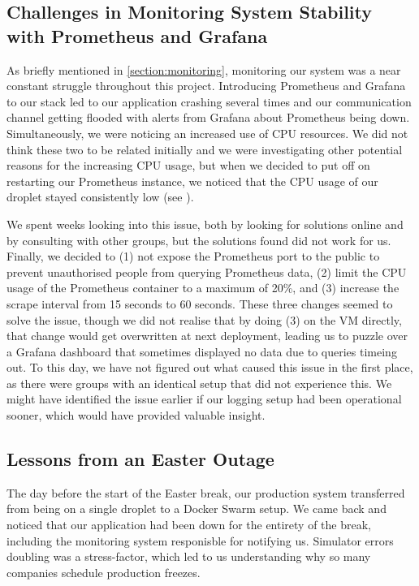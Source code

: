 \subsection{Challenges in Monitoring System Stability with Prometheus and Grafana}
As briefly mentioned in \ref{section:monitoring}, monitoring our system was a near constant struggle throughout this project. Introducing Prometheus and Grafana to our stack led to our application crashing several times and our communication channel getting flooded with alerts from Grafana about Prometheus being down. Simultaneously, we were noticing an increased use of CPU resources. We did not think these two to be related initially and we were investigating other potential reasons for the increasing CPU usage, but when we decided to put off on restarting our Prometheus instance, we noticed that the CPU usage of our droplet stayed consistently low (see \cite{noauthor_minitwit_nodate}).

We spent weeks looking into this issue, both by looking for solutions online and by consulting with other groups, but the solutions found did not work for us. Finally, we decided to (1) not expose the Prometheus port to the public to prevent unauthorised people from querying Prometheus data, (2) limit the CPU usage of the Prometheus container to a maximum of 20\%, and (3) increase the scrape interval from 15 seconds to 60 seconds. These three changes seemed to solve the issue, though we did not realise that by doing (3) on the VM directly, that change would get overwritten at next deployment, leading us to puzzle over a Grafana dashboard that sometimes displayed no data due to queries timeing out. To this day, we have not figured out what caused this issue in the first place, as there were groups with an identical setup that did not experience this. We might have identified the issue earlier if our logging setup had been operational sooner, which would have provided valuable insight.

\subsection{Lessons from an Easter Outage}

The day before the start of the Easter break, our production system transferred from being on a single droplet to a Docker Swarm setup. We came back and noticed that our application had been down for the entirety of the break, including the monitoring system responisble for notifying us. Simulator errors doubling was a stress-factor, which led to us understanding why so many companies schedule production freezes.

